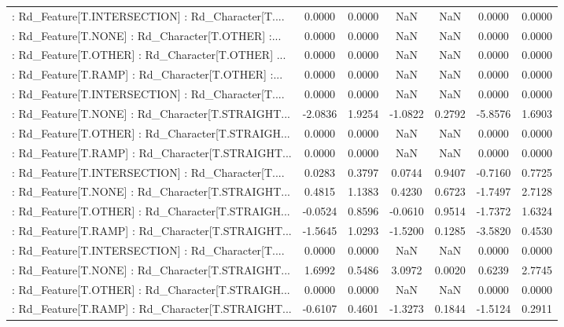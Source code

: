 \begin{longtable}{p{4cm}cccccc}
 : Rd\_Feature[T.INTERSECTION] : Rd\_Character[T.... &  0.0000 &    0.0000 &     NaN &          NaN &  0.0000 &  0.0000 \\
 : Rd\_Feature[T.NONE] : Rd\_Character[T.OTHER] :... &  0.0000 &    0.0000 &     NaN &          NaN &  0.0000 &  0.0000 \\
 : Rd\_Feature[T.OTHER] : Rd\_Character[T.OTHER] ... &  0.0000 &    0.0000 &     NaN &          NaN &  0.0000 &  0.0000 \\
 : Rd\_Feature[T.RAMP] : Rd\_Character[T.OTHER] :... &  0.0000 &    0.0000 &     NaN &          NaN &  0.0000 &  0.0000 \\
 : Rd\_Feature[T.INTERSECTION] : Rd\_Character[T.... &  0.0000 &    0.0000 &     NaN &          NaN &  0.0000 &  0.0000 \\
 : Rd\_Feature[T.NONE] : Rd\_Character[T.STRAIGHT... & -2.0836 &    1.9254 & -1.0822 &       0.2792 & -5.8576 &  1.6903 \\
 : Rd\_Feature[T.OTHER] : Rd\_Character[T.STRAIGH... &  0.0000 &    0.0000 &     NaN &          NaN &  0.0000 &  0.0000 \\
 : Rd\_Feature[T.RAMP] : Rd\_Character[T.STRAIGHT... &  0.0000 &    0.0000 &     NaN &          NaN &  0.0000 &  0.0000 \\
 : Rd\_Feature[T.INTERSECTION] : Rd\_Character[T.... &  0.0283 &    0.3797 &  0.0744 &       0.9407 & -0.7160 &  0.7725 \\
 : Rd\_Feature[T.NONE] : Rd\_Character[T.STRAIGHT... &  0.4815 &    1.1383 &  0.4230 &       0.6723 & -1.7497 &  2.7128 \\
 : Rd\_Feature[T.OTHER] : Rd\_Character[T.STRAIGH... & -0.0524 &    0.8596 & -0.0610 &       0.9514 & -1.7372 &  1.6324 \\
 : Rd\_Feature[T.RAMP] : Rd\_Character[T.STRAIGHT... & -1.5645 &    1.0293 & -1.5200 &       0.1285 & -3.5820 &  0.4530 \\
 : Rd\_Feature[T.INTERSECTION] : Rd\_Character[T.... &  0.0000 &    0.0000 &     NaN &          NaN &  0.0000 &  0.0000 \\
 : Rd\_Feature[T.NONE] : Rd\_Character[T.STRAIGHT... &  1.6992 &    0.5486 &  3.0972 &       0.0020 &  0.6239 &  2.7745 \\
 : Rd\_Feature[T.OTHER] : Rd\_Character[T.STRAIGH... &  0.0000 &    0.0000 &     NaN &          NaN &  0.0000 &  0.0000 \\
 : Rd\_Feature[T.RAMP] : Rd\_Character[T.STRAIGHT... & -0.6107 &    0.4601 & -1.3273 &       0.1844 & -1.5124 &  0.2911 \\

\end{longtable}
